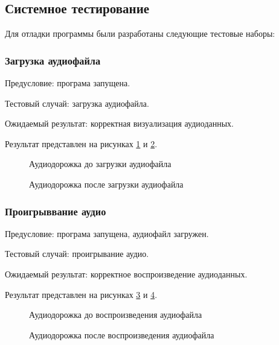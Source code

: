 \subsection{Системное тестирование}

Для отладки программы были разработаны следующие тестовые наборы:
	
\subsubsection{Загрузка аудиофайла}
Предусловие: програма запущена.

Тестовый случай: загрузка аудиофайла.
	
Ожидаемый результат: корректная визуализация аудиоданных.

Результат представлен на рисунках \ref{test_case:image} и \ref{test_case1:image}.

\begin{figure}[H]
\caption{Аудиодорожка до загрузки аудиофайла}
\label{test_case:image}
\end{figure}

\begin{figure}[H] 
	\caption{Аудиодорожка после загрузки аудиофайла}
	\label{test_case1:image}
\end{figure}

\subsubsection{Проигрыввание аудио}
Предусловие: програма запущена, аудиофайл загружен.

Тестовый случай: проигрывание аудио.

Ожидаемый результат: корректное воспроизведение аудиоданных.

Результат представлен на рисунках \ref{test_case2:image} и \ref{test_case3:image}.

\begin{figure}[H]
	\caption{Аудиодорожка до воспроизведения аудиофайла}
	\label{test_case2:image}
\end{figure}

\begin{figure}[H] 
	\caption{Аудиодорожка после воспроизведения аудиофайла}
	\label{test_case3:image}
\end{figure}


